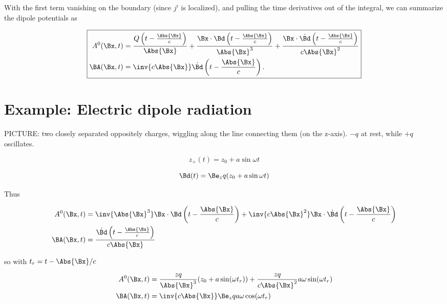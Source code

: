 With the first term vanishing on the boundary (since $j^i$ is localized), and pulling the time derivatives out of the integral, we can summarize the dipole potentials as

\begin{equation}\label{eqn:relativisticElectrodynamicsL20:250}
\boxed{
\begin{aligned}
A^0(\Bx, t) &= \frac{Q\left(t - \frac{\Abs{\Bx}}{c}\right)}{\Abs{\Bx}} + \frac{\Bx \cdot \Bd\left(t - \frac{\Abs{\Bx}}{c}\right)}{\Abs{\Bx}^3} + \frac{\Bx \cdot \dot{\Bd}\left(t - \frac{\Abs{\Bx}}{c}\right)}{c \Abs{\Bx}^2} \\
\BA(\Bx, t) &= \inv{c \Abs{\Bx}} \dot{\Bd}\left(t - \frac{\Abs{\Bx}}{c}\right).
\end{aligned}
}
\end{equation}

\section{Example: Electric dipole radiation}

PICTURE: two closely separated oppositely charges, wiggling along the line connecting them (on the z-axis).  $-q$ at rest, while $+q$ oscillates.

\begin{equation}\label{eqn:relativisticElectrodynamicsL20:270}
z_+(t) = z_0 + a \sin\omega t
\end{equation}

\begin{equation}\label{eqn:relativisticElectrodynamicsL20:290}
\Bd(t) = \Be_z q (z_0 + a \sin\omega t)
\end{equation}

Thus

\begin{align}\label{eqn:relativisticElectrodynamicsL20:310}
A^0(\Bx, t) &= \inv{\Abs{\Bx}^3} \Bx \cdot \Bd\left(t - \frac{\Abs{\Bx}}{c}\right) + \inv{c \Abs{\Bx}^2} \Bx \cdot \dot{\Bd}\left(t - \frac{\Abs{\Bx}}{c}\right) \\
\BA(\Bx, t) &= \frac{\dot{\Bd}\left(t - \frac{\Abs{\Bx}}{c}\right)}{c \Abs{\Bx}}
\end{align}

so with $t_r = t - \Abs{\Bx}/c$

\begin{align}\label{eqn:relativisticElectrodynamicsL20:400}
A^0(\Bx, t) &= 
\frac{z q}{\Abs{\Bx}^3} ( z_0 + a \sin(\omega t_r) ) + \frac{z q}{c \Abs{\Bx}^2} a \omega \sin(\omega t_r) \\
\BA(\Bx, t) &= \inv{c \Abs{\Bx}} \Be_z q a \omega \cos(\omega t_r)
\end{align}

